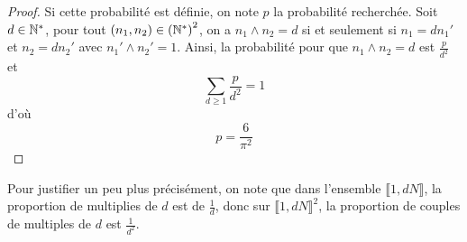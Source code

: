 \documentclass[12pt]{article}
\begin{document}
\begin{proof}
    Si cette probabilité est définie, on note $p$ la probabilité recherchée. Soit $d\in\mathbb{N}^{*}$, pour tout $(n_{1},n_{2})\in\left(\mathbb{N}^{*}\right)^{2}$, on a $n_{1}\wedge n_{2}=d$ si et seulement si $n_{1}=dn_{1}'$ et $n_{2}=dn_{2}'$ avec $n_{1}'\wedge n_{2}'=1$. Ainsi, la probabilité pour que $n_{1}\wedge n_{2}=d$ est $\frac{p}{d^{2}}$ et 
    \begin{equation}
        \sum_{d\geqslant1}\frac{p}{d^{2}}=1
    \end{equation}
    d'où 
    \begin{equation}
        \boxed{p=\frac{6}{\pi^{2}}}
    \end{equation}
\end{proof}

\begin{remark}
    Pour justifier un peu plus précisément, on note que dans l'ensemble $\llbracket 1,dN\rrbracket$, la proportion de multiplies de $d$ est de $\frac{1}{d}$, donc sur $\llbracket 1,dN\rrbracket^{2}$, la proportion de couples de multiples de $d$ est  $\frac{1}{d^{2}}$.
\end{remark}
\end{document}
